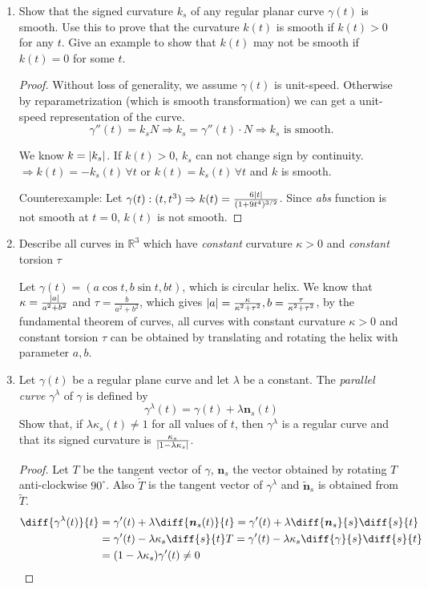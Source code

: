 \documentclass{article}
\DeclarePairedDelimiter\abs{\lvert}{\rvert}
\begin{document}
\courseheader
{}
\begin{enumerate}
\item Show that the signed curvature $k_s$ of any regular planar curve $\gamma(t)$ is smooth. Use this to prove that the curvature $k(t)$ is smooth if $k(t)>0$ for any $t$. Give an example to show that $k(t)$ may not be smooth if $k(t)=0$ for some $t$.
\begin{proof}
Without loss of generality, we assume $\gamma(t)$ is unit-speed. Otherwise by reparametrization (which is smooth transformation) we can get a unit-speed representation of the curve.
$$\gamma''(t) = k_s N \Rightarrow k_s = \gamma''(t) \cdot N \Rightarrow k_s \textrm{ is smooth.}$$

We know $k=\abs{k_s}$. If $k(t)>0$, 
$k_s$ can not change sign by continuity.$\Rightarrow k(t)=-k_s(t)\,\forall t$ or $k(t)=k_s(t)\,\forall t$ and $k$ is smooth.

Counterexample: Let $\gamma(t):(t,t^3)\Rightarrow k(t)=\frac{6\abs{t}}{(1+9t^4)^{3/2}}$. Since \textit{abs} function is not smooth at $t=0$, $k(t)$ is not smooth.
\end{proof}
\item Describe all curves in $\mathbb{R}^3$ which have \textit{constant} curvature $\kappa>0$ and \textit{constant} torsion $\tau$
\begin{solution}
Let $\gamma(t) = (a\cos t, b\sin t, bt)$, which is circular helix. We know that $\kappa = \frac{\abs{a}}{a^2+b^2}$ and $\tau = \frac{b}{a^2+b^2}$, which gives $ \abs{a}=\frac{\kappa}{\kappa^2+\tau^2},b=\frac{\tau}{\kappa^2+\tau^2}$, by the fundamental theorem of curves, all curves with constant curvature $\kappa>0$ and constant torsion $\tau$ can be obtained by translating and rotating the helix with parameter $a,b$.
\end{solution}

\item Let $\gamma(t)$ be a regular plane curve and let $\lambda$ be a constant. The \textit{parallel curve} $\gamma^{\lambda}$ of $\gamma$ is defined by
\begin{equation}
\gamma^{\lambda}(t) = \gamma(t) + \lambda \bm{n}_s (t)
\end{equation}
Show that, if $\lambda \kappa_s(t) \neq 1 $ for all values of $t$, then $\gamma^{\lambda}$ is a regular curve and that its signed curvature is 
$\frac{\kappa_s}{\abs{1-\lambda \kappa_s}}$.
\begin{proof}
Let $T$ be the tangent vector of $\gamma$, 
$\bm{n}_s$ the vector obtained by rotating $T$ anti-clockwise $90^\circ$.
Also $\widetilde{T}$ is the tangent vector of $\gamma^{\lambda}$ and $\tilde{\bm{n}}_s$ is obtained from $\widetilde{T}$. 
\begin{align*}
    \diff{\gamma^{\lambda}(t)}{t} & = \gamma'(t) +\lambda \diff{\bm{n}_s (t)}{t}  =   \gamma'(t) + \lambda \diff{\bm{n}_s}{s}\diff{s}{t}\\
    & =\gamma'(t) - \lambda \kappa_s \diff{s}{t} T = \gamma'(t)-\lambda \kappa_s\diff{\gamma}{s} \diff{s}{t}\\
    & = (1-\lambda\kappa_s)\gamma'(t) \neq 0
\end{align*}
    

\end{proof}
\end{enumerate}
\end{document}
